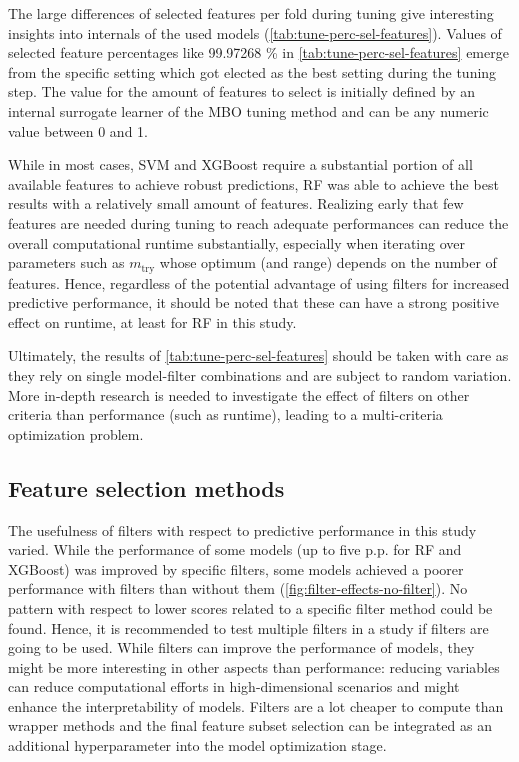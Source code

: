 \documentclass[final]{IEEEtran}
\begin{document}
The large differences of selected features per fold during tuning give interesting insights into internals of the used models (\autoref{tab:tune-perc-sel-features}).
Values of selected feature percentages like 99.97268 \% in \autoref{tab:tune-perc-sel-features} emerge from the specific setting which got elected as the best setting during the tuning step.
The value for the amount of features to select is initially defined by an internal surrogate learner of the MBO tuning method and can be any numeric value between 0 and 1.

While in most cases, SVM and XGBoost require a substantial portion of all available features to achieve robust predictions, RF was able to achieve the best results with a relatively small amount of features.
Realizing early that few features are needed during tuning to reach adequate performances can reduce the overall computational runtime substantially, especially when iterating over parameters such as $m_\textrm{try}$ whose optimum (and range) depends on the number of features.
Hence, regardless of the potential advantage of using filters for increased predictive performance, it should be noted that these can have a strong positive effect on runtime, at least for RF in this study.


Ultimately, the results of \autoref{tab:tune-perc-sel-features} should be taken with care as they rely on single model-filter combinations and are subject to random variation.
More in-depth research is needed to investigate the effect of filters on other criteria than performance (such as runtime), leading to a multi-criteria optimization problem.

\subsection{Feature selection methods}

The usefulness of filters with respect to predictive performance in this study varied.
While the performance of some models (up to five p.p. for RF and XGBoost) was improved by specific filters, some models achieved a poorer performance with filters than without them (\autoref{fig:filter-effects-no-filter}).
No pattern with respect to lower scores related to a specific filter method could be found.
Hence, it is recommended to test multiple filters in a study if filters are going to be used.
While filters can improve the performance of models, they might be more interesting in other aspects than performance: reducing variables can reduce computational efforts in high-dimensional scenarios and might enhance the interpretability of models.
Filters are a lot cheaper to compute than wrapper methods and the final feature subset selection can be integrated as an additional hyperparameter into the model optimization stage.
\end{document}

